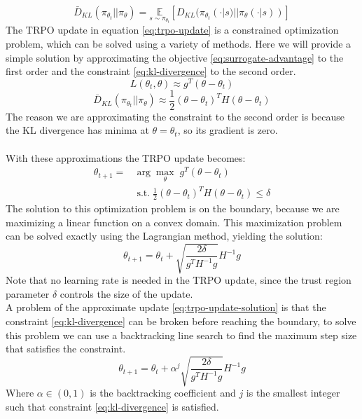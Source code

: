 \begin{equation}
    \bar D_{KL}(\pi_{\theta_t} || \pi_{\theta}) = \underset{s \sim \pi_{\theta_t}}{\mathbb{E}} \left[ D_{KL}(\pi_{\theta_t}(\cdot|s) || \pi_{\theta}(\cdot|s)) \right]
    \label{eq:kl-divergence}
\end{equation}
The TRPO update in equation \eqref{eq:trpo-update} is a constrained optimization problem, which can be solved using a variety of methods. Here we will provide a simple solution by approximating the objective \eqref{eq:surrogate-advantage} to the first order and the constraint \eqref{eq:kl-divergence} to the second order.\\
\begin{equation}
    L(\theta_t, \theta) \approx g^T (\theta - \theta_t)
\end{equation}
\begin{equation}
    \bar D_{KL}(\pi_{\theta_t} || \pi_{\theta}) \approx \frac{1}{2} (\theta - \theta_t)^T H (\theta - \theta_t)
\end{equation}
The reason we are approximating the constraint to the second order is because the KL divergence has minima at $\theta = \theta_t$, so its gradient is zero.\\\\
With these approximations the TRPO update becomes:
\begin{equation}
    \begin{split}
        \theta_{t+1} = & \arg\max_{\theta} \; g^T (\theta - \theta_t)\\
        & \; \text{s.t.} \; \frac{1}{2} (\theta - \theta_t)^T H (\theta - \theta_t) \leq \delta        
    \end{split}
    \label{eq:trpo-update-approx}
\end{equation}
The solution to this optimization problem is on the boundary, because we are maximizing a linear function on a convex domain. This maximization problem can be solved exactly using the Lagrangian method, yielding the solution:
\begin{equation}
    \theta_{t+1} = \theta_t + \sqrt{\frac{2\delta}{g^T H^{-1} g}} H^{-1} g
    \label{eq:trpo-update-solution}
\end{equation}
Note that no learning rate is needed in the TRPO update, since the trust region parameter $\delta$ controls the size of the update.\\
A problem of the approximate update \eqref{eq:trpo-update-solution} is that the constraint \eqref{eq:kl-divergence} can be broken before reaching the boundary, to solve this problem we can use a backtracking line search to find the maximum step size that satisfies the constraint.\\
\begin{equation}
    \theta_{t+1} = \theta_t + \alpha^j \sqrt{\frac{2\delta}{g^T H^{-1} g}} H^{-1} g
    \label{eq:trpo-update-line-search}
\end{equation}
Where $\alpha \in (0, 1)$ is the backtracking coefficient and $j$ is the smallest integer such that constraint \eqref{eq:kl-divergence} is satisfied.\\

